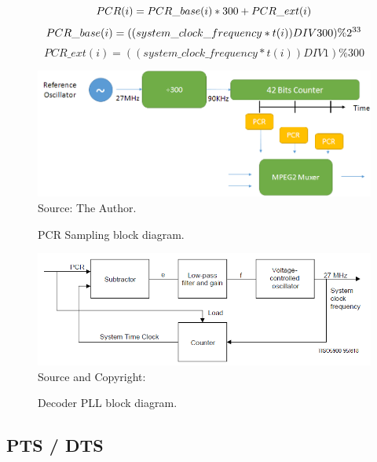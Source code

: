 \documentclass[
	12pt,				%
	openright,			%
	twoside,			%
	a4paper,			%
	brazil,
	french,				%
	english
	]{abntex2}
\begin{document}
\begin{equation}
PCR(i) = PCR\_base(i) * 300 + PCR\_ext(i)\\
\label{eq:pcr1}
\end{equation}
\begin{equation}
PCR\_base(i) = ((system\_clock\_frequency * t(i)) DIV 300) \% 2^{33}\\
\label{eq:pcr2}
\end{equation}
\begin{equation}
PCR\_ext(i) = ((system\_clock\_frequency * t(i)) DIV 1) \% 300
\label{eq:pcr3}
\end{equation}

\begin{figure}[!hb]
\centering
\caption{PCR Sampling block diagram.}
\includegraphics[width=1\linewidth]{figuras/pcr_sampling.png}
\\Source: The Author.
\label{fig:pcr_sampling}
\end{figure}

\begin{figure}[!hb]
\centering
\caption{Decoder PLL block diagram.}
\includegraphics[width=1\linewidth]{figuras/pll_decoder.png}
\\Source and Copyright: 
\label{fig:pll_decoder}
\end{figure}

\subsection{PTS / DTS}
\label{PTS_DTS}
\end{document}
